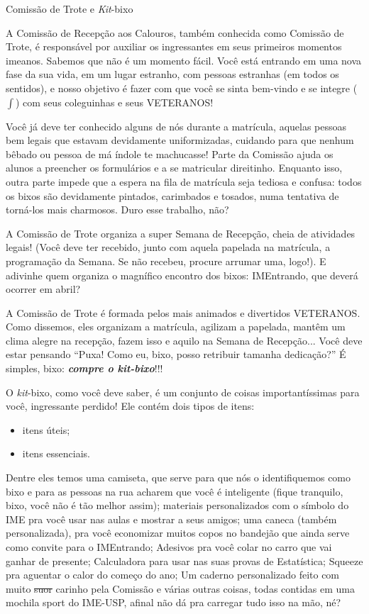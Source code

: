 \begin{secao}{Comissão de Trote e \textit{Kit}-bixo}

A Comissão de Recepção aos Calouros, também conhecida como Comissão de Trote,
é responsável por auxiliar os ingressantes em seus primeiros momentos imeanos.
Sabemos que não é um momento fácil. Você está entrando em uma nova fase da
sua vida, em um lugar estranho, com pessoas estranhas (em todos os sentidos), e
nosso objetivo é fazer com que você se sinta bem-vindo e se integre ($\int$)
com seus coleguinhas e seus VETERANOS!

Você já deve ter conhecido alguns de nós durante a matrícula, aquelas pessoas
bem legais que estavam devidamente uniformizadas, cuidando para que nenhum
bêbado ou pessoa de má índole te machucasse! Parte da Comissão ajuda os
alunos a preencher os formulários e a se matricular direitinho. Enquanto isso,
outra parte impede que a espera na fila de matrícula seja tediosa e confusa:
todos os bixos são devidamente pintados, carimbados e tosados, numa tentativa
de torná-los mais charmosos. Duro esse trabalho, não?

A Comissão de Trote organiza a super Semana de Recepção, cheia de atividades
legais! (Você deve ter recebido, junto com aquela papelada na matrícula, a
programação da Semana. Se não recebeu, procure arrumar uma, logo!).
E adivinhe quem organiza o magnífico encontro dos bixos: IMEntrando, que deverá
ocorrer em abril? %

A Comissão de Trote é formada pelos mais animados e divertidos VETERANOS. Como
dissemos, eles organizam a matrícula, agilizam a papelada, mantêm um clima
alegre na recepção, fazem isso e aquilo na Semana de Recepção...
Você deve estar pensando ``Puxa! Como eu, bixo, posso retribuir
tamanha dedicação?'' É simples, bixo: {\bf\em compre o \textit{kit}-bixo}!!!

O \textit{kit}-bixo, como você deve saber, é um conjunto de coisas importantíssimas
para você, ingressante perdido! Ele contém dois tipos de itens:
\begin{itemize}
\item itens úteis;
\item itens essenciais. 
\end{itemize}
Dentre eles temos uma camiseta, que serve para que
nós o identifiquemos como bixo e para as pessoas na rua acharem que você é
inteligente (fique tranquilo, bixo, você não é tão melhor assim);
 materiais personalizados com o símbolo do IME pra você usar nas aulas e mostrar a seus amigos;
 uma caneca (também personalizada), pra você economizar muitos copos no bandejão
que ainda serve como convite para o IMEntrando;
 Adesivos pra você colar no carro que vai ganhar de presente;
 Calculadora para usar nas suas provas de Estatística;
 Squeeze pra aguentar o calor do começo do ano;
 Um caderno personalizado feito com muito \sout{suor} carinho pela Comissão e
 várias outras coisas, todas contidas em uma mochila sport do IME-USP, afinal
 não dá pra carregar tudo isso na mão, né?


\end{secao}
